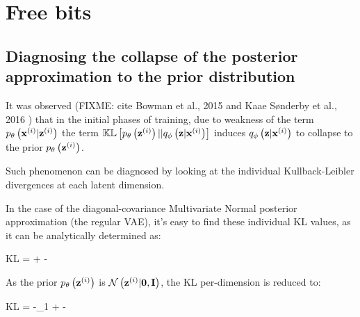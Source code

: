 \section{Free bits}

\subsection{Diagnosing the collapse of the posterior approximation to the prior distribution}

It was observed\cite{Kingma2017}\cite{1611.02731} (FIXME: cite Bowman et al., 2015 and Kaae Sønderby et al., 2016 )
that in the initial phases of training, due to weakness of the term $p_\theta\left({\mathbf{x}^{(i)}}|{\mathbf{z}^{(i)}}\right)$ the term $\mathbb{KL}\left[ p_\theta\left({\mathbf{z}^{(i)}}\right) || q_\phi\left(\mathbf{z}|{\mathbf{x}^{(i)}}\right) \right]$ 
induces $q_\phi\left(\mathbf{z}|{\mathbf{x}^{(i)}}\right)$ to collapse to the prior $p_\theta\left({\mathbf{z}^{(i)}}\right)$.

Such phenomenon can be diagnosed by looking at the individual Kullback-Leibler divergences
at each latent dimension.

In the case of the diagonal-covariance Multivariate Normal posterior approximation
(the regular VAE), it's easy to find these individual KL values, as it can be analytically determined as:

\begin{nalign}
KL = \log {} + -
\end{nalign}

As the prior $p_\theta\left({\mathbf{z}^{(i)}}\right)$ is $\mathcal{N}\left({\mathbf{z}^{(i)}}|\mathbf{0},\mathbf{I}\right)$, the KL per-dimension is reduced to:

\begin{nalign}
KL = -\log \sigma_1 + -
\end{nalign}


